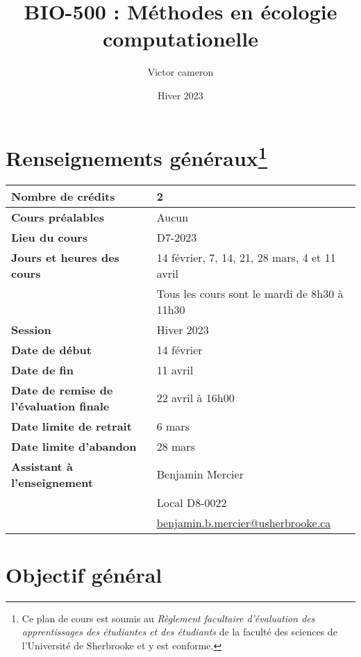 \documentclass[12]{article}
\title{BIO-500 : Méthodes en écologie computationelle}
\date {Hiver 2023}
\author {Victor cameron}
\affil {Département de biologie \\
Université de Sherbrooke \\ 
Local D8-0012 \\ 
819-821-8000 \#61928}
\affil {\url{victor.cameron@usherbrooke.ca}}
\begin{document}
	\maketitle

	\section*{Renseignements généraux\footnote{Ce plan de cours est soumis au \textit{Règlement facultaire d'évaluation des apprentissages des étudiantes et des étudiants} de la faculté des sciences de l'Université de Sherbrooke et y est conforme.}} 
        
        \begin{center}
			\begin{tabular}{ m{22em} m{24em} }
				\hline
				\hline
				\textbf{Nombre de crédits} & 2 \\ 
				\hline
				\textbf{Cours préalables} & Aucun \\
				\hline
				\textbf{Lieu du cours} & D7-2023 \\
				\hline
				\textbf{Jours et heures des cours} & 14 février, 7, 14, 21, 28 mars, 4 et 11 avril \\ & Tous les cours sont le mardi de 8h30 à 11h30 \\
				\hline
				\textbf{Session} & Hiver 2023 \\
				\hline
				\textbf{Date de début} & 14 février \\
				\hline
				\textbf{Date de fin} & 11 avril \\
				\hline
				\textbf{Date de remise de l'évaluation finale} & 22 avril à 16h00 \\
				\hline
				\textbf{Date limite de retrait} & 6 mars \\
				\hline
				\textbf{Date limite d'abandon} & 28 mars \\
				\hline
				\textbf{Assistant à l'enseignement} & Benjamin Mercier \\ & Local D8-0022 \\ & \url{benjamin.b.mercier@usherbrooke.ca} \\
				\hline
				\hline
			\end{tabular}
        \end{center}

	\section*{Objectif général}
\end{document}
